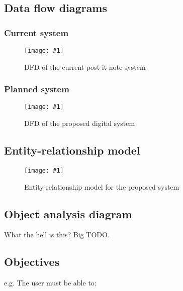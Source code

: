 \subsection{Data flow diagrams}
\subsubsection{Current system}

\newcommand{\addfigure}[3]{
    \begin{figure}[H]
        \centering
        \texttt{[image: \#1]}
        \caption{#2}
        \label{#3}
    \end{figure}
}

\addfigure
    {dfd-orig}
    {DFD of the current post-it note system}
    {fig:dfd-orig}

\subsubsection{Planned system}

\addfigure
    {dfd-new}
    {DFD of the proposed digital system}
    {fig:dfd-new}


\subsection{Entity-relationship model}

\addfigure
    {er-model-new}
    {Entity-relationship model for the proposed system}
    {fig:er-model-new}


\subsection{Object analysis diagram}

What the hell is this? Big TODO.


\subsection{Objectives}


e.g. The user must be able to:

